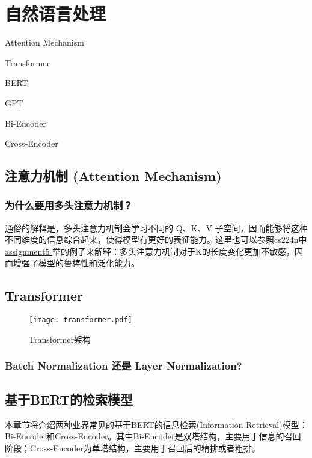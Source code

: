 \chapter{自然语言处理}
\begin{introduction}
  \item Attention Mechanism
  \item Transformer
  \item BERT
  \item GPT
  \item Bi-Encoder
  \item Cross-Encoder
\end{introduction}

\section{注意力机制 (Attention Mechanism)}


\subsection{为什么要用多头注意力机制？}

通俗的解释是，多头注意力机制会学习不同的 Q、K、V 子空间，因而能够将这种不同维度的信息综合起来，使得模型有更好的表征能力。这里也可以参照cs224n中\href{https://web.stanford.edu/class/cs224n/assignments/a5.pdf}{ assignment5 }举的例子来解释：多头注意力机制对于K的长度变化更加不敏感，因而增强了模型的鲁棒性和泛化能力。

\section{Transformer}

\begin{figure}[htbp]
  \centering
  \texttt{[image: transformer.pdf]}
  \caption{Transformer架构 \label{fig:transformer}}
\end{figure}


\subsection{Batch Normalization 还是 Layer Normalization?}

\section{基于BERT的检索模型}

本章节将介绍两种业界常见的基于BERT的信息检索(Information Retrieval)模型：Bi-Encoder和Cross-Encoder。其中Bi-Encoder是双塔结构，主要用于信息的召回阶段；Cross-Encoder为单塔结构，主要用于召回后的精排或者粗排。

